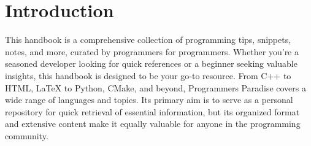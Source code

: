\chapter{Introduction}
\thispagestyle{fancy}

This handbook is a comprehensive collection of programming tips, snippets, notes, and more, curated by programmers for programmers. Whether you're a seasoned developer looking for quick references or a beginner seeking valuable insights, this handbook is designed to be your go-to resource. From C++ to HTML, LaTeX to Python, CMake, and beyond, Programmers Paradise covers a wide range of languages and topics. Its primary aim is to serve as a personal repository for quick retrieval of essential information, but its organized format and extensive content make it equally valuable for anyone in the programming community. 